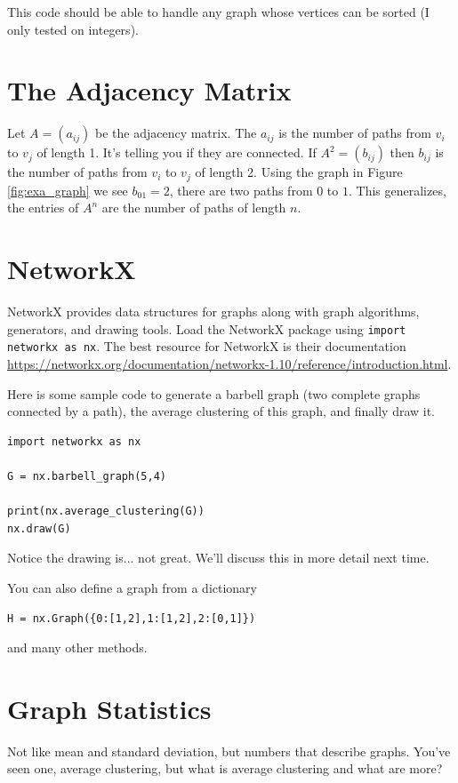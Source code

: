 \documentclass[11pt,letterpaper]{article}
\begin{document}
This code should be able to handle any graph whose vertices can be sorted (I only tested on 
integers). 

\section{The Adjacency Matrix}
Let $A=(a_{ij})$ be the adjacency matrix. The $a_{ij}$ is the number of paths from $v_i$ to $v_j$
of length 1. It's telling you if they are connected. If $A^2=(b_{ij})$ then $b_{ij}$ is the number
of paths from $v_i$ to $v_j$ of length 2. Using the graph in Figure \ref{fig:exa_graph} we see
$b_{01}=2$, there are two paths from $0$ to $1$. This generalizes, the entries of $A^n$ are the
number of paths of length $n$.



\section{NetworkX}
NetworkX provides data structures for graphs along with graph algorithms, generators, and drawing tools. Load the NetworkX package using \texttt{import networkx as nx}. The best resource for NetworkX is their documentation \url{https://networkx.org/documentation/networkx-1.10/reference/introduction.html}. 


Here is some sample code to generate a barbell graph (two complete graphs connected by a path), the average clustering of this graph, and finally draw it.
\begin{verbatim}
import networkx as nx

G = nx.barbell_graph(5,4)

print(nx.average_clustering(G))
nx.draw(G)
\end{verbatim}
Notice the drawing is... not great. We'll discuss this in more detail next time. 

You can also define a graph from a dictionary
\begin{verbatim}
H = nx.Graph({0:[1,2],1:[1,2],2:[0,1]})
\end{verbatim}
and many other methods. 


\section{Graph Statistics}
Not like mean and standard deviation, but numbers that describe graphs. You've seen one, average clustering, but what is average clustering and what are more?
\end{document}
